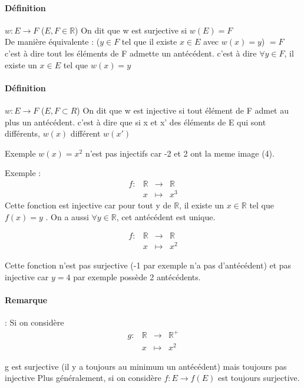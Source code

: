 \paragraph{Définition} $w : E \rightarrow F$ ($E, F \in \mathbb{R}$)
On dit que w est surjective si $w(E) = F$ ~\\
De manière équivalente : ($y \in F$ tel que il existe $x \in E$ avec $w(x) = y$) $= F$ c'est à dire tout les éléments de F admette un antécédent.
c'est à dire $ \forall y \in F$, il existe un $x \in E$ tel que $w(x) = y$

\paragraph{Définition} $w : E \rightarrow F$ ($E, F \subset R$)
On dit que w est injective si tout élément de F admet au plus un antécédent.
c'est à dire que si x et x' des éléments de E qui sont différents, $w(x)$ différent $w(x')$

Exemple $w(x) = x^2$ n'est pas injectifs car -2 et 2 ont la meme image (4).

Exemple :
\[\begin{array}{rccl}
	f : & \mathbb{R} & \rightarrow & \mathbb{R} \\
	& x & \mapsto & x^3
\end{array}\]
Cette fonction est injective car pour tout y de $\mathbb{R}$, il existe un $x \in \mathbb{R}$ tel que $f(x) = y$ . On a aussi $\forall y \in \mathbb{R}$, cet antécédent est unique.

\[\begin{array}{rccl}
	f : & \mathbb{R} & \rightarrow & \mathbb{R} \\
	& x & \mapsto & x^2
\end{array}\]

Cette fonction n'est pas surjective (-1 par exemple n'a pas d'antécédent) et pas injective car $y=4$ par exemple possède 2 antécédents.

\paragraph{Remarque} : Si on considère 
\[\begin{array}{rccl}
	g : & \mathbb{R} & \rightarrow & \mathbb{R}^+ \\
	& x & \mapsto & x^2
\end{array}\]

g est surjective (il y a toujours au minimum un antécédent) mais toujours pas injective
Plus généralement, si on considère $f:E \rightarrow f(E)$ est toujours surjective.

